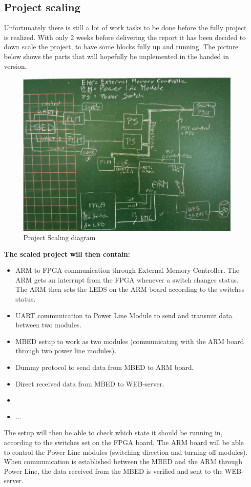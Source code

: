 \subsection{Project scaling}
Unfortunately there is still a lot of work tasks to be done before the fully project is realized. With only 2 weeks before delivering the report it has been decided to down scale the project, to have some blocks fully up and running. The picture below shows the parts that will hopefully be implemented in the handed in version. 
\begin{figure}[H]
	\begin{centering}
		\includegraphics[width=1.0\textwidth]{images/project_scaling_tb6.jpg}
		\caption{Project Scaling diagram}
	\end{centering}
\end{figure}
\textbf{The scaled project will then contain:} 
\begin{itemize}
	\item ARM to FPGA communication through External Memory Controller. The ARM gets an interrupt from the FPGA whenever a switch changes status. The ARM then sets the LEDS on the ARM board according to the switches status.
	\item UART communication to Power Line Module to send and transmit data between two modules. 
	\item MBED setup to work as two modules (communicating with the ARM board through two power line modules).
	\item Dummy protocol to send data from MBED to ARM board. 
	\item Direct received data from MBED to WEB-server.
	\item {}
	\item ...
\end{itemize} 
The setup will then be able to check which state it should be running in, according to the switches set on the FPGA board. The ARM board will be able to control the Power Line modules (switching direction and turning off modules). When communication is established between the MBED and the ARM through Power Line, the data received from the MBED is verified and sent to the WEB-server. 

